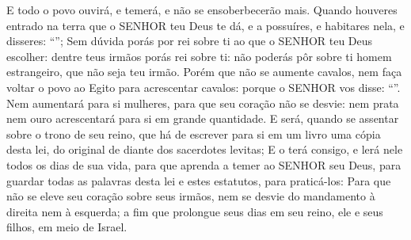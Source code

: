 {{  E todo o povo ouvirá, e temerá, e não se ensoberbecerão mais.
  Quando houveres entrado na terra que o SENHOR teu Deus te dá, e a possuíres, e habitares nela, e disseres: \enquote{};
  Sem dúvida porás por rei sobre ti ao que o SENHOR teu Deus escolher: dentre teus irmãos porás rei sobre ti: não poderás pôr sobre ti homem estrangeiro, que não seja teu irmão.
  Porém que não se aumente cavalos, nem faça voltar o povo ao Egito para acrescentar cavalos: porque o SENHOR vos disse: \enquote{}.
  Nem aumentará para si mulheres, para que seu coração não se desvie: nem prata nem ouro acrescentará para si em grande quantidade.
  E será, quando se assentar sobre o trono de seu reino, que há de escrever para si em um livro uma cópia desta lei, do original de diante dos sacerdotes levitas;
  E o terá consigo, e lerá nele todos os dias de sua vida, para que aprenda a temer ao SENHOR seu Deus, para guardar todas as palavras desta lei e estes estatutos, para praticá-los:
  Para que não se eleve seu coração sobre seus irmãos, nem se desvie do mandamento à direita nem à esquerda; a fim que prolongue seus dias em seu reino, ele e seus filhos, em meio de Israel}.
\par }

